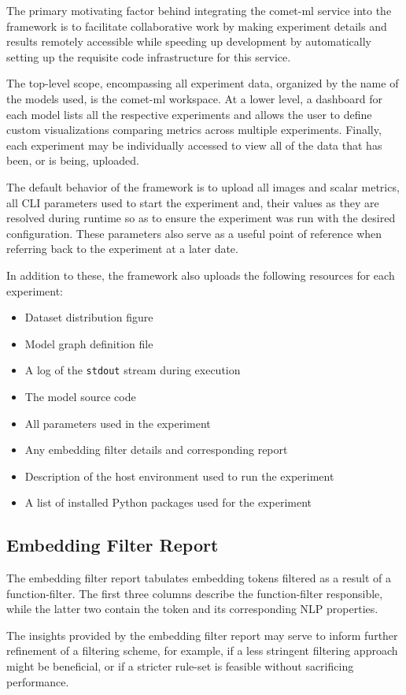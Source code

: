 \documentclass[../../fyp.tex]{subfiles}
\begin{document}
 \label{sec:comet_ml_integration}
The primary motivating factor behind integrating the comet-ml service into the framework is to facilitate collaborative work by making experiment details and results remotely accessible while speeding up development by automatically setting up the requisite code infrastructure for this service.

The top-level scope, encompassing all experiment data, organized by the name of the models used, is the comet-ml workspace. At a lower level, a dashboard for each model lists all the respective experiments and allows the user to define custom visualizations comparing metrics across multiple experiments. Finally, each experiment may be individually accessed to view all of the data that has been, or is being, uploaded.

The default behavior of the framework is to upload all images and scalar metrics, all CLI parameters used to start the experiment and, their values as they are resolved during runtime so as to ensure the experiment was run with the desired configuration. These parameters also serve as a useful point of reference when referring back to the experiment at a later date. 

In addition to these, the framework also uploads the following resources for each experiment:
\begin{itemize}
\item Dataset distribution figure
\item Model graph definition file
\item A log of the \texttt{stdout} stream during execution
\item The model source code
\item All parameters used in the experiment
\item Any embedding filter details and corresponding report
\item Description of the host environment used to run the experiment 
\item A list of installed Python packages used for the experiment
\end{itemize}

\subsection{Embedding Filter Report}
The embedding filter report tabulates embedding tokens filtered as a result of a function-filter. The first three columns describe the function-filter responsible, while the latter two contain the token and its corresponding NLP properties. 

The insights provided by the embedding filter report may serve to inform further refinement of a filtering scheme, for example, if a less stringent filtering approach might be beneficial, or if a stricter rule-set is feasible without sacrificing performance. 
\end{document}
